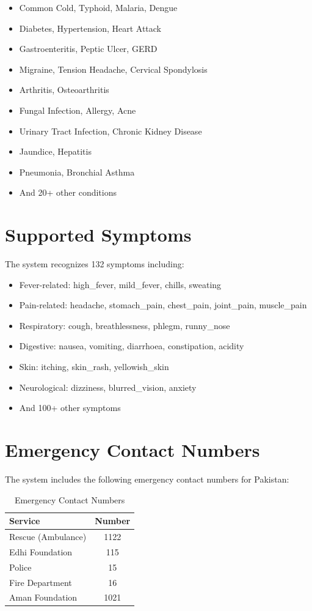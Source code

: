 \begin{itemize}
    \item Common Cold, Typhoid, Malaria, Dengue
    \item Diabetes, Hypertension, Heart Attack
    \item Gastroenteritis, Peptic Ulcer, GERD
    \item Migraine, Tension Headache, Cervical Spondylosis
    \item Arthritis, Osteoarthritis
    \item Fungal Infection, Allergy, Acne
    \item Urinary Tract Infection, Chronic Kidney Disease
    \item Jaundice, Hepatitis
    \item Pneumonia, Bronchial Asthma
    \item And 20+ other conditions
\end{itemize}

\section{Supported Symptoms}
The system recognizes 132 symptoms including:

\begin{itemize}
    \item Fever-related: high\_fever, mild\_fever, chills, sweating
    \item Pain-related: headache, stomach\_pain, chest\_pain, joint\_pain, muscle\_pain
    \item Respiratory: cough, breathlessness, phlegm, runny\_nose
    \item Digestive: nausea, vomiting, diarrhoea, constipation, acidity
    \item Skin: itching, skin\_rash, yellowish\_skin
    \item Neurological: dizziness, blurred\_vision, anxiety
    \item And 100+ other symptoms
\end{itemize}

\section{Emergency Contact Numbers}
The system includes the following emergency contact numbers for Pakistan:

\begin{table}[H]
\centering
\caption{Emergency Contact Numbers}
\begin{tabular}{|l|c|}
\hline
\textbf{Service} & \textbf{Number} \\
\hline
Rescue (Ambulance) & 1122 \\
\hline
Edhi Foundation & 115 \\
\hline
Police & 15 \\
\hline
Fire Department & 16 \\
\hline
Aman Foundation & 1021 \\
\hline
\end{tabular}
\end{table}

